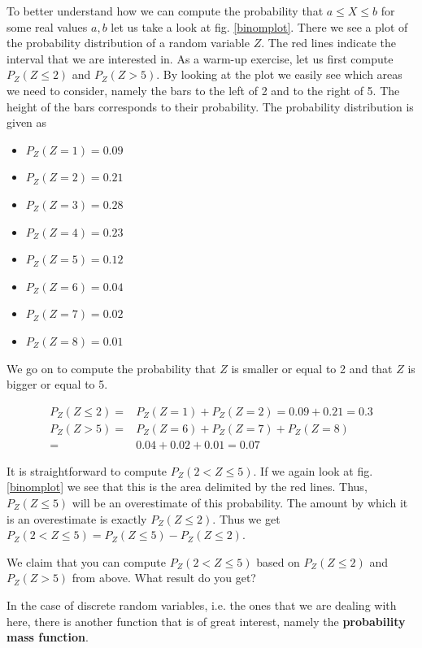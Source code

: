 \documentclass[a4paper,11pt,leqno]{report}
\begin{document}
To better understand how we can compute the probability that $ a \leq X \leq b $ for some real values $ a,b $ let us take a 
look at fig. \ref{binomplot}. There we see a plot of the probability distribution of a random variable $ Z $. The red lines
indicate the interval that we are interested in. As a warm-up exercise, let us first compute $ P_{Z}(Z \leq 2) $ and 
$ P_{Z}(Z > 5) $. By looking at the plot we easily see which areas we need to consider, namely the bars to the left of 2
and to the right of 5. The height of the bars corresponds to their probability. The probability distribution is given as
\begin{itemize}
\item $ P_{Z}(Z = 1) = 0.09 $
\item $ P_{Z}(Z = 2) = 0.21 $
\item $ P_{Z}(Z = 3) = 0.28 $
\item $ P_{Z}(Z = 4) = 0.23 $
\item $ P_{Z}(Z = 5) = 0.12 $
\item $ P_{Z}(Z = 6) = 0.04 $
\item $ P_{Z}(Z = 7) = 0.02 $
\item $ P_{Z}(Z = 8) = 0.01 $
\end{itemize}

We go on to compute the probability that $ Z $ is smaller or equal to 2 and that $ Z $ is bigger or equal to 5.

\begin{align}
P_{Z}(Z \leq 2) =& P_{Z}(Z=1) + P_{Z}(Z=2) = 0.09 + 0.21 = 0.3 \\
P_{Z}(Z > 5) =& P_{Z}(Z=6) + P_{Z}(Z=7) + P_{Z}(Z=8) \\ 
=& 0.04 + 0.02 + 0.01 = 0.07 \nonumber
\end{align} 

It is straightforward to compute $ P_{Z}(2 < Z \leq 5) $. If we again look at fig. \ref{binomplot} we see that this is
the area delimited by the red lines. Thus, $ P_{Z}(Z \leq 5) $ will be an overestimate of this probability. The amount by
which it is an overestimate is exactly $ P_{Z}(Z \leq 2) $. Thus we get $ P_{Z}(2 < Z \leq 5) = P_{Z}(Z \leq 5) - P_{Z}(Z \leq 2) $.

\begin{Exercise}
We claim that you can compute $ P_{Z}(2 < Z \leq 5) $ based on $ P_{Z}(Z \leq 2) $ and $ P_{Z}(Z > 5) $ from above. What result do
you get?
\end{Exercise}

In the case of discrete random variables, i.e. the ones that we are dealing with here, there is another function that is of great 
interest, namely the \textbf{probability mass function}.
\end{document}
